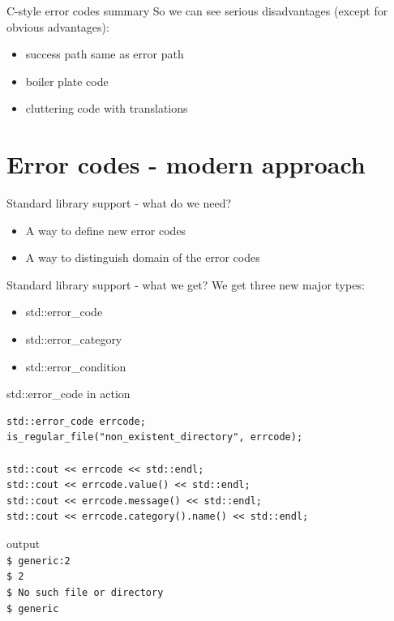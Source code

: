\documentclass[10pt]{beamer}
\begin{document}
\begin{frame}{C-style error codes summary}
	So we can see {\color{red}serious disadvantages} (except for {\color{blue}obvious advantages}):
	
	\begin{itemize}[<+- | alert@+>]
		\item success path same as error path
		\item boiler plate code
		\item cluttering code with translations
	\end{itemize}
\end{frame}
	

\section{Error codes - modern approach}
\begin{frame}{Standard library support - what do we need?}
	\begin{itemize}
		\item A way to define new error codes
		\item A way to distinguish domain of the error codes
	\end{itemize}
\end{frame}

\begin{frame}{Standard library support - what we get?}
	We get three new major types:
	\begin{itemize}[<+- | alert@+>]
		\item std::error\_code
		\item std::error\_category
		\item std::error\_condition
	\end{itemize}
\end{frame}
	

\begin{frame}[fragile]{std::error\_code in action}
	\begin{verbatim}
std::error_code errcode;
is_regular_file("non_existent_directory", errcode);

std::cout << errcode << std::endl;
std::cout << errcode.value() << std::endl;
std::cout << errcode.message() << std::endl;
std::cout << errcode.category().name() << std::endl;
	\end{verbatim}
	
	\hrulefill
	
	\begin{block}{output}
	\texttt{\\
		\$ generic:2 \\
		\$ 2 \\
		\$ No such file or directory \\
		\$ generic}	
	\end{block}
	
\end{frame}
\end{document}
